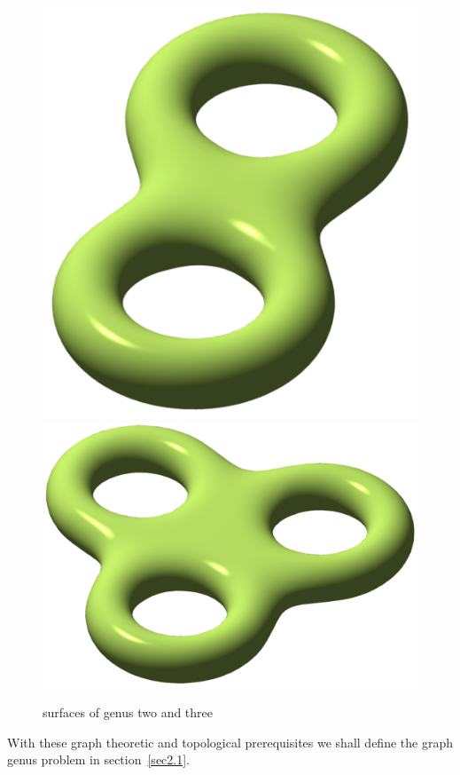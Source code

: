 \documentclass{article}
\begin{document}
    \begin{figure}[h]
        \centering
        \includegraphics[scale = 0.8]{Double_torus_illustration.png} 
        \includegraphics[scale = 0.5]{1920px-Triple_torus_illustration.png} 
        \caption{surfaces of genus two and three}
        \label{Fig3}
    \end{figure}

    With these graph theoretic and topological prerequisites we shall define the graph genus problem in section~\ref{sec2.1}. 
\end{document}
